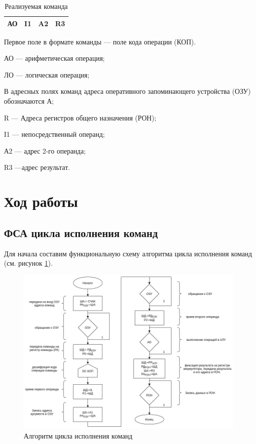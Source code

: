 \documentclass[a4paper,14pt]{extarticle}
\begin{document}
\begin{table}[h!]
	\centering
	\caption{Реализуемая команда}
	\begin{tabular}{|c|c|c|c|}
	\hline
	АО & I1 &A2 &R3  \\
	\hline
\end{tabular}
\label{tab:command}
\end{table}


Первое поле в формате команды — поле кода операции (КОП).

АО — арифметическая операция;

ЛО — логическая операция;

В адресных полях команд адреса оперативного запоминающего устройства (ОЗУ) обозначаются А;

R --- Адреса регистров общего назначения (РОН);

I1 --- непосредственный операнд;

А2 --- адрес 2-го операнда;

R3 ---адрес результат.



\section*{Ход работы}




\subsection*{ФСА цикла исполнения команд}

Для начала составим функциональную схему алгоритма цикла исполнения команд (см. рисунок \ref{fig:func-alg}).


\begin{figure}[htbp]
	\centering
	\includegraphics[width=0.6\linewidth]{images/func-alg-pr1}
	\caption{Алгоритм цикла исполнения команд}
	\label{fig:func-alg}
\end{figure}
\newpage
\end{document}
